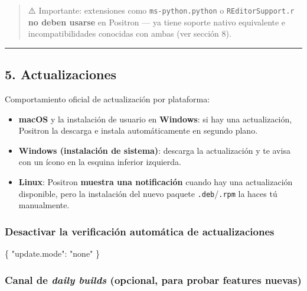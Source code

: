 \documentclass[
  doc,
  floatsintext,
  longtable,
  a4paper,
  nolmodern,
  notxfonts,
  notimes,
  12pt,
  colorlinks=true,linkcolor=blue,citecolor=blue,urlcolor=blue]{apa7}
\newenvironment{Shaded}{\begin{snugshade}}{\end{snugshade}}
\newcommand{\DataTypeTok}[1]{\textcolor[rgb]{0.68,0.00,0.00}{#1}}
\newcommand{\FunctionTok}[1]{\textcolor[rgb]{0.28,0.35,0.67}{#1}}
\newcommand{\StringTok}[1]{\textcolor[rgb]{0.13,0.47,0.30}{#1}}
\providecommand{\tightlist}{%
  \setlength{\itemsep}{0pt}\setlength{\parskip}{0pt}}
\newcounter{none} %
\begin{document}
\begin{quote}
⚠️ Importante: extensiones como \texttt{ms-python.python} o
\texttt{REditorSupport.r} \textbf{no deben usarse} en Positron --- ya
tiene soporte nativo equivalente e incompatibilidades conocidas con
ambas (ver sección 8).
\end{quote}

\begin{center}\rule{0.5\linewidth}{0.5pt}\end{center}

\subsection{5. Actualizaciones}\label{actualizaciones}

Comportamiento oficial de actualización por plataforma:

\begin{itemize}
\tightlist
\item
  \textbf{macOS} y la instalación de usuario en \textbf{Windows}: si hay
  una actualización, Positron la descarga e instala automáticamente en
  segundo plano.
\item
  \textbf{Windows (instalación de sistema)}: descarga la actualización y
  te avisa con un ícono en la esquina inferior izquierda.
\item
  \textbf{Linux}: Positron \textbf{muestra una notificación} cuando hay
  una actualización disponible, pero la instalación del nuevo paquete
  \texttt{.deb}/\texttt{.rpm} la haces tú manualmente.
\end{itemize}

\subsubsection{Desactivar la verificación automática de
actualizaciones}\label{desactivar-la-verificaciuxf3n-automuxe1tica-de-actualizaciones}

\begin{Shaded}
\begin{Highlighting}[]
\FunctionTok{\{}
  \DataTypeTok{"update.mode"}\FunctionTok{:} \StringTok{"none"}
\FunctionTok{\}}
\end{Highlighting}
\end{Shaded}

\subsubsection{\texorpdfstring{Canal de \emph{daily builds} (opcional,
para probar features
nuevas)}{Canal de daily builds (opcional, para probar features nuevas)}}\label{canal-de-daily-builds-opcional-para-probar-features-nuevas}
\end{document}
